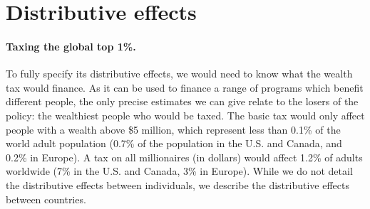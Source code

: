 \documentclass[12pt,english]{article}
\begin{document}

\section{Distributive effects}\label{sec:distribution}

\paragraph{Taxing the global top 1\%.} To fully specify its distributive effects, we would need to know what the wealth tax would finance. As it can be used to finance a range of programs which benefit different people, the only precise estimates we can give relate to the losers of the policy: the wealthiest people who would be taxed. The basic tax would only affect people with a wealth above \$5 million, which represent less than 0.1\% of the world adult population (0.7\% of the population in the U.S. and Canada, and 0.2\% in Europe). A tax on all millionaires (in dollars) would affect 1.2\% of adults worldwide (7\% in the U.S. and Canada, 3\% in Europe). While we do not detail the distributive effects between individuals, we describe the distributive effects between countries.
\end{document}
